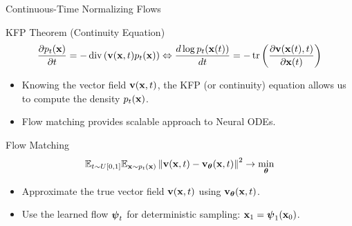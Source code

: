 \documentclass{beamer}
\renewcommand{\eqpause}{}
\begin{document}
\begin{frame}{Continuous-Time Normalizing Flows}
	\begin{block}{KFP Theorem (Continuity Equation)}
		\vspace{-0.5cm}
		\[
			\frac{\partial p_t(\mathbf{x})}{\partial t} = - \operatorname{div}\left(\mathbf{v}(\mathbf{x}, t) p_t(\mathbf{x})\right) \Leftrightarrow \frac{d \log p_t(\mathbf{x}(t))}{d t} = - \operatorname{tr} \left( \frac{\partial \mathbf{v}(\mathbf{x}(t), t)}{\partial \mathbf{x}(t)} \right)
		\]
		\vspace{-0.3cm}
	\end{block}
	\begin{itemize}
		\item Knowing the vector field $\mathbf{v} (\mathbf{x}, t)$, the KFP (or continuity) equation allows us to compute the density $p_t(\mathbf{x})$.
		\item Flow matching provides scalable approach to Neural ODEs.
	\end{itemize}
    \eqpause
	\begin{block}{Flow Matching}
		\vspace{-0.3cm}
		\[
			\mathbb{E}_{t \sim U[0, 1]} \mathbb{E}_{\mathbf{x} \sim p_t(\mathbf{x})}\left\| \mathbf{v}(\mathbf{x}, t) - \mathbf{v}_{\boldsymbol{\theta}}(\mathbf{x}, t) \right\|^2 \rightarrow \min_{\boldsymbol{\theta}}
		\]
		\vspace{-0.3cm}
	\end{block}
    \eqpause
	\begin{itemize}
		\item Approximate the true vector field $\mathbf{v} (\mathbf{x}, t)$ using $\mathbf{v}_{\boldsymbol{\theta}}(\mathbf{x}, t)$.
		\item Use the learned flow $\boldsymbol{\psi}_t$ for deterministic sampling: $\mathbf{x}_1 = \boldsymbol{\psi}_1(\mathbf{x}_0)$.
	\end{itemize}
\end{frame}
\end{document}
